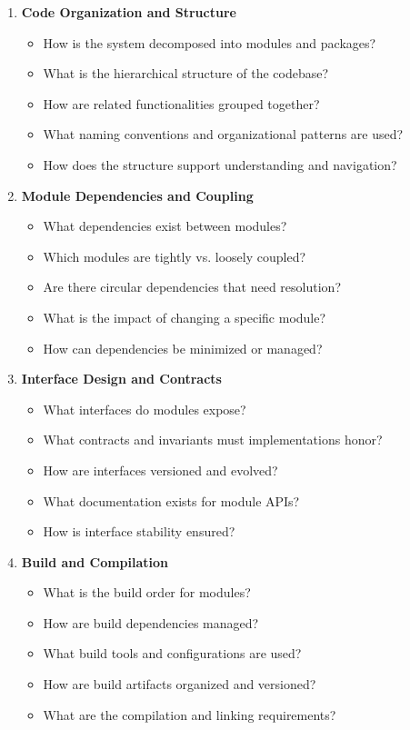\documentclass[11pt,letterpaper]{article}
\begin{document}
\begin{enumerate}[label=\textbf{C\arabic*:}, leftmargin=2.5em]
    \item \textbf{Code Organization and Structure}
    \begin{itemize}[nosep]
        \item How is the system decomposed into modules and packages?
        \item What is the hierarchical structure of the codebase?
        \item How are related functionalities grouped together?
        \item What naming conventions and organizational patterns are used?
        \item How does the structure support understanding and navigation?
    \end{itemize}
    
    \item \textbf{Module Dependencies and Coupling}
    \begin{itemize}[nosep]
        \item What dependencies exist between modules?
        \item Which modules are tightly vs. loosely coupled?
        \item Are there circular dependencies that need resolution?
        \item What is the impact of changing a specific module?
        \item How can dependencies be minimized or managed?
    \end{itemize}
    
    \item \textbf{Interface Design and Contracts}
    \begin{itemize}[nosep]
        \item What interfaces do modules expose?
        \item What contracts and invariants must implementations honor?
        \item How are interfaces versioned and evolved?
        \item What documentation exists for module APIs?
        \item How is interface stability ensured?
    \end{itemize}
    
    \item \textbf{Build and Compilation}
    \begin{itemize}[nosep]
        \item What is the build order for modules?
        \item How are build dependencies managed?
        \item What build tools and configurations are used?
        \item How are build artifacts organized and versioned?
        \item What are the compilation and linking requirements?
    \end{itemize}
    

\end{enumerate}
\end{document}
